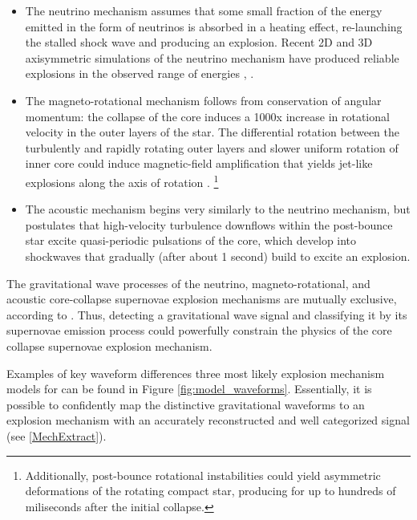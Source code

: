 \begin{itemize}
\item The neutrino mechanism assumes that some small fraction of the energy emitted in the form of neutrinos is absorbed in a heating effect, re-launching the stalled shock wave and producing an explosion. Recent 2D and 3D axisymmetric simulations of the neutrino mechanism have produced reliable explosions in the observed range of energies \cite{Ott-SN_GWs}, \cite{Louge}. 

\item The magneto-rotational mechanism follows from conservation of angular momentum: the collapse of the core induces a 1000x increase in rotational velocity \cite{Ott-SN_GWs} in the outer layers of the star. The differential rotation between the turbulently and rapidly rotating outer layers and slower uniform rotation of inner core could induce magnetic-field amplification that yields jet-like explosions along the axis of rotation \cite{Louge}. \footnote{Additionally, post-bounce rotational instabilities could yield asymmetric deformations of the rotating compact star, producing  for up to hundreds of miliseconds after the initial collapse.}  

\item The acoustic mechanism begins very similarly to the neutrino mechanism, but postulates that high-velocity turbulence downflows within the post-bounce star excite quasi-periodic pulsations of the core, which develop into shockwaves that gradually (after about 1 second) build to excite an explosion. 
\end{itemize}

The gravitational wave processes of the neutrino, magneto-rotational, and acoustic core-collapse supernovae explosion mechanisms are mutually exclusive, according to \cite{Ott-SN_GWs}. Thus, detecting a gravitational wave signal and classifying it by its supernovae emission process could powerfully constrain the physics of the core collapse supernovae explosion mechanism.

Examples of key waveform differences three most likely explosion mechanism models for \sn{}  can be found in Figure \ref{fig:model_waveforms}. Essentially, it is possible to confidently map the distinctive gravitational waveforms to an explosion mechanism with an accurately reconstructed and well categorized signal (see \ref{MechExtract}).

